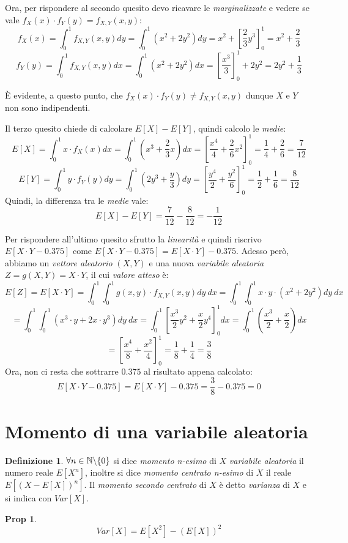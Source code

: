 \documentclass[12pt, a4paper]{report}
\theoremstyle{definition}
\newtheorem{definition}{Definizione}[section]
\newtheorem*{proposition}{Prop}
\DeclareRobustCommand{\N}{\mathbb{N}}%
\begin{document}
Ora, per rispondere al secondo quesito devo ricavare le \emph{marginalizzate} e
vedere se vale \(f_X(x)\cdot f_Y(y)=f_{X,Y}(x,y)\):
\[f_X(x)=\int_0^1f_{X,Y}(x,y)dy=\int_0^1(x^2+2y^2)dy=x^2+\left[\frac{2}{3}y^3
\right]_0^1=x^2+\frac{2}{3}\]
\[f_Y(y)=\int_0^1f_{X,Y}(x,y)dx=\int_0^1(x^2+2y^2)dx=\left[\frac{x^3}{3}\right]_0^1
+2y^2=2y^2+\frac{1}{3}\]

È evidente, a questo punto, che \(f_X(x)\cdot f_Y(y)\neq f_{X,Y}(x,y)\) dunque $X$ e
$Y$ non sono indipendenti.

Il terzo quesito chiede di calcolare \(E[X]-E[Y]\), quindi calcolo le \emph{medie}:
\[E[X]=\int_0^1x\cdot f_X(x)dx=\int_0^1\left(x^3+\frac{2}{3}x\right)dx=\left[\frac{x^4}
{4}+\frac{2}{6}x^2\right]_0^1=\frac{1}{4}+\frac{2}{6}=\frac{7}{12}\]
\[E[Y]=\int_0^1y\cdot f_Y(y)dy=\int_0^1\left(2y^3+\frac{y}{3}\right)dy=\left[\frac{y^4}
{2}+\frac{y^2}{6}\right]_0^1=\frac{1}{2}+\frac{1}{6}=\frac{8}{12}\]
Quindi, la differenza tra le \emph{medie} vale:
\[E[X]-E[Y]=\frac{7}{12}-\frac{8}{12}=-\frac{1}{12}\]

Per rispondere all'ultimo quesito sfrutto la \emph{linearità} e quindi riscrivo
\(E[X\cdot Y-0.375]\) come \(E[X\cdot Y-0.375]=E[X\cdot Y]-0.375\). Adesso però, abbiamo un
\emph{vettore aleatorio} $(X,Y)$ e una nuova \emph{variabile aleatoria} $Z=g(X,Y)
=X\cdot Y$, il cui \emph{valore atteso} è:
\[E[Z]=E[X\cdot Y]=\int_0^1\int_0^1g(x,y)\cdot f_{X,Y}(x,y)dy\ dx=\int_0^1\int_0^1x\cdot y\cdot (x^2
+2y^2)dy\ dx\]
\[=\int_0^1\int_0^1(x^3\cdot y+2x\cdot y^3)dy\ dx=\int_0^1\left[\frac{x^3}{2}y^2+\frac{x}
{2}y^4\right]_0^1dx=\int_0^1\left(\frac{x^3}{2}+\frac{x}{2}\right)dx\]
\[=\left[\frac{x^4}{8}+\frac{x^2}{4}\right]_0^1=\frac{1}{8}+\frac{1}{4}=\frac{3}{8}\]
Ora, non ci resta che sottrarre $0.375$ al risultato appena calcolato:
\[E[X\cdot Y-0.375]=E[X\cdot Y]-0.375=\frac{3}{8}-0.375=0\]

\section{Momento di una variabile aleatoria}
\begin{definition}
	\(\forall n\in\N\symbol{92}\{0\}\) si dice \emph{momento n-esimo} di $X$
	\emph{variabile aleatoria} il numero reale $E[X^n]$, inoltre si dice \emph
	{momento centrato n-esimo} di $X$ il reale \(E[(X-E[X])^n]\).
	Il \emph{momento secondo centrato} di $X$ è detto \emph{varianza} di $X$ e
	si indica con $Var[X]$.
\end{definition}
\begin{proposition}
	\[Var[X]=E[X^2]-(E[X])^2\]
\end{proposition}
\end{document}
